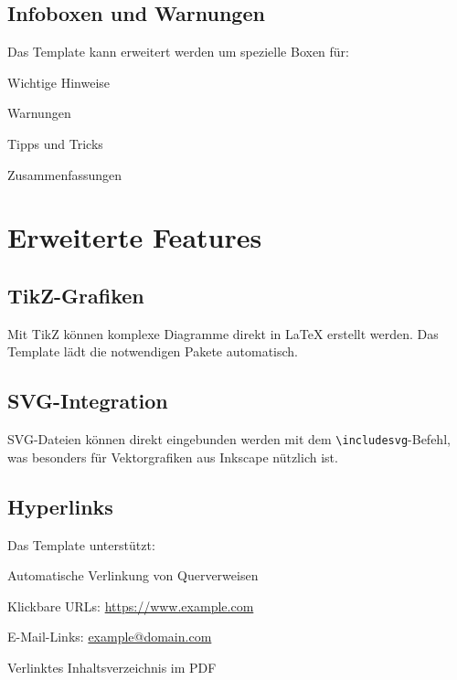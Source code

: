 \subsection{Infoboxen und Warnungen}
\label{subsec:infoboxen}

Das Template kann erweitert werden um spezielle Boxen für:
\begin{listenabsatz}
	\item Wichtige Hinweise
	\item Warnungen
	\item Tipps und Tricks
	\item Zusammenfassungen
\end{listenabsatz}

\section{Erweiterte Features}
\label{sec:erweiterte_features}

\subsection{TikZ-Grafiken}
\label{subsec:tikz}

Mit TikZ können komplexe Diagramme direkt in \LaTeX{} erstellt werden. Das Template lädt die notwendigen Pakete automatisch.

\subsection{SVG-Integration}
\label{subsec:svg}

SVG-Dateien können direkt eingebunden werden mit dem \texttt{\textbackslash includesvg}-Befehl, was besonders für Vektorgrafiken aus Inkscape nützlich ist.

\subsection{Hyperlinks}
\label{subsec:hyperlinks}

Das Template unterstützt:
\begin{listenabsatz}
	\item Automatische Verlinkung von Querverweisen
	\item Klickbare URLs: \url{https://www.example.com}
	\item E-Mail-Links: \href{mailto:example@domain.com}{example@domain.com}
	\item Verlinktes Inhaltsverzeichnis im PDF
\end{listenabsatz}

